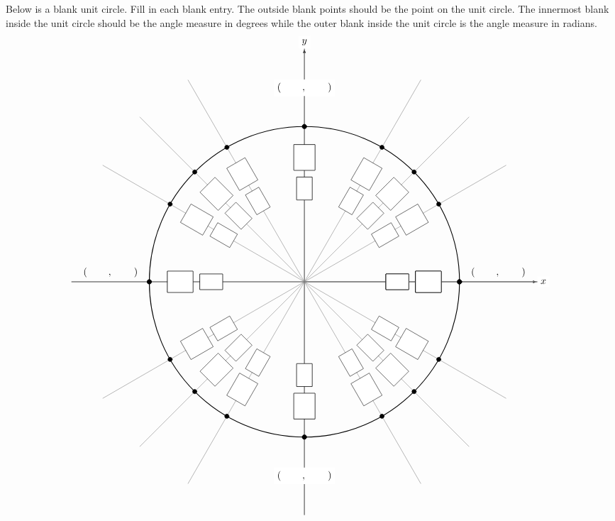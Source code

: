 \documentclass[12pt,letterpaper]{exam}
\begin{document}
\begin{questions}

\newpage
{} \par\vspace{0.3cm}

Below is a blank unit circle. Fill in each blank entry. The outside blank points should be the point on the unit circle. The innermost blank inside the unit circle should be the angle measure in degrees while the outer blank inside the unit circle is the angle measure in radians. 
	\[
	\begin{tikzpicture}[scale=5.5,cap=round,>=latex]

        \draw[->] (-1.5cm ,0cm) -- (1.5cm, 0cm) node[right, fill= white] {$x$};
        \draw[->] (0cm, -1.5cm) -- (0cm, 1.5cm) node[above, fill= white] {$y$};

        \draw[thick] (0cm,0cm) circle(1cm);

        \foreach \x in {0,30,...,360} {
                \draw[gray] (0cm, 0cm) -- (\x:1.5cm);
                \filldraw[black] (\x:1cm) circle(0.4pt);
		\draw node[draw, fill= white, shape= rectangle, minimum height= 0.55cm, minimum width= 0.8cm, anchor= center, rotate= \x] at (\x:0.6cm) {};
		\draw node[draw, fill= white, shape= rectangle, minimum height= 0.75cm, minimum width= 0.9cm, anchor= center, rotate= \x] at (\x:0.8cm) {};
	}
	
	\foreach \x in {0,45,...,360} {
		\draw[gray] (0cm, 0cm) -- (\x:1.5cm);
		\filldraw[black] (\x:1cm) circle(0.4pt);
		\draw node[draw, fill= white, shape= rectangle, minimum height= 0.55cm, minimum width= 0.8cm, anchor= center, rotate= \x] at (\x:0.6cm) {};
		\draw node[draw, fill= white, shape= rectangle, minimum height= 0.75cm, minimum width= 0.9cm, anchor= center, rotate= \x] at (\x:0.8cm) {};
	}
		
        \draw (-1.25cm,0cm) node[above=1pt] {$(\hspace{.75cm},\hspace{.75cm})$}
	(1.25cm,0cm)  node[above=1pt] {$(\hspace{.75cm},\hspace{.75cm})$}
	(0cm,-1.25cm) node[fill=white] {$(\hspace{.75cm},\hspace{.75cm})$}
	(0cm,1.25cm)  node[fill=white] {$(\hspace{.75cm},\hspace{.75cm})$};
	

\end{tikzpicture}\]
\end{questions}
\end{document}
